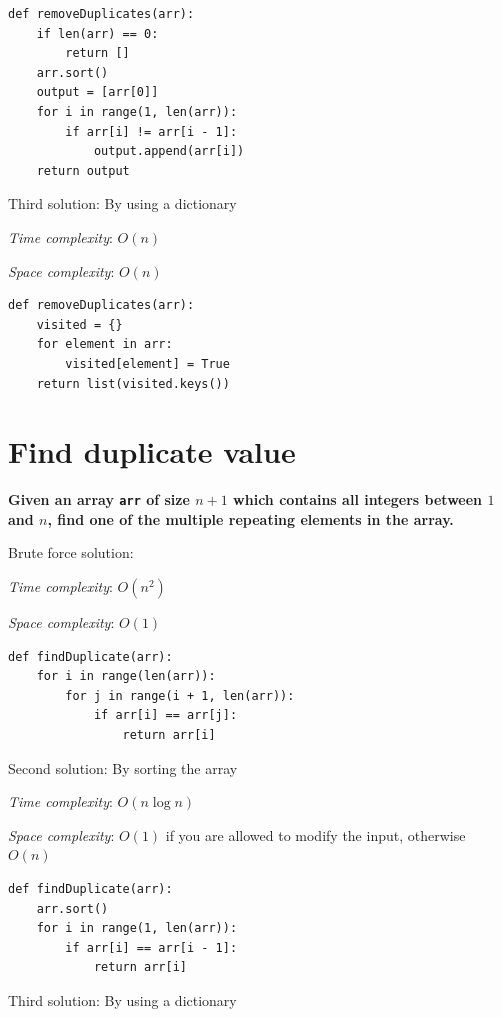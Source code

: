 \documentclass[a4paper,11pt]{book}
\begin{document}
\begin{lstlisting}
def removeDuplicates(arr):
    if len(arr) == 0:
        return []
    arr.sort()
    output = [arr[0]]
    for i in range(1, len(arr)):
        if arr[i] != arr[i - 1]:
            output.append(arr[i])
    return output
\end{lstlisting}

\noindent Third solution: By using a dictionary

\noindent \textit{Time complexity}: $O(n)$

\noindent \textit{Space complexity}: $O(n)$

\begin{lstlisting}
def removeDuplicates(arr):
    visited = {}
    for element in arr:
        visited[element] = True
    return list(visited.keys())
\end{lstlisting}

\newpage
\section{Find duplicate value}

\textbf{Given an array \lstinline{arr} of size $n + 1$ which contains all integers between $1$ and $n$, find one of the multiple repeating elements in the array. }
\vspace{5mm}

\noindent Brute force solution:

\noindent \textit{Time complexity}: $O(n^2)$

\noindent \textit{Space complexity}: $O(1)$

\begin{lstlisting}
def findDuplicate(arr):
    for i in range(len(arr)):
        for j in range(i + 1, len(arr)):
            if arr[i] == arr[j]:
                return arr[i]
\end{lstlisting}

\noindent Second solution: By sorting the array

\noindent \textit{Time complexity}: $O(n\log n)$

\noindent \textit{Space complexity}: $O(1)$ if you are allowed to modify the input, otherwise $O(n)$

\begin{lstlisting}
def findDuplicate(arr):
    arr.sort()
    for i in range(1, len(arr)):
        if arr[i] == arr[i - 1]:
            return arr[i]
\end{lstlisting}

\noindent Third solution: By using a dictionary
\end{document}
